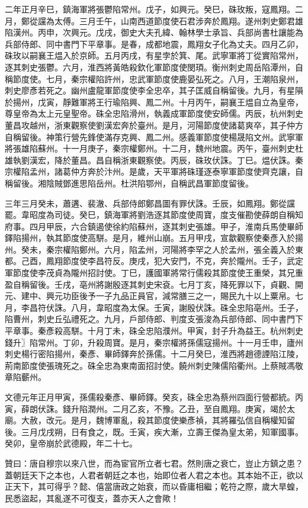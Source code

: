 \begin{pinyinscope}
 二年正月辛巳，鎮海軍將張鬱陷常州。戊子，如興元。癸巳，硃玫叛，寇鳳翔。二月，鄭從讜為太傅。三月壬午，山南西道節度使石君涉奔於鳳翔。遂州刺史鄭君雄陷漢州。丙申，次興元。戊戌，御史大夫孔緯、翰林學士承旨、兵部尚書杜讓能為兵部侍郎、同中書門下平章事。是春，成都地震，鳳翔女子化為丈夫。四月乙卯，硃玫以嗣襄王煴入於京師。五月丙戌，有星孛於箕、尾。武寧軍將丁從實陷常州，逐其刺史張鬱。六月，淮西將黃皓殺欽化軍節度使閔頊。衡州刺史周岳陷潭州，自稱節度使。七月，秦宗權陷許州，忠武軍節度使鹿晏弘死之。八月，王潮陷泉州，刺史廖彥若死之。幽州盧龍軍節度使李全忠卒，其子匡威自稱留後。九月，有星隕於揚州，戊寅，靜難軍將王行瑜陷興、鳳二州。十月丙午，嗣襄王煴自立為皇帝，尊皇帝為太上元皇聖帝。硃全忠陷滑州，執義成軍節度使安師儒。丙辰，杭州刺史董昌攻越州，浙東觀察使劉漢宏奔於臺州。是月，河陽節度使諸葛爽卒，其子仲方自稱留後。神策行營先鋒使滿存克興、鳳二州。感義軍節度使楊晟陷文州。武寧軍將張雄陷蘇州。十一月庚子，秦宗權鄭州。十二月，魏州地震。丙午，臺州刺史杜雄執劉漢宏，降於董昌。昌自稱浙東觀察使。丙辰，硃玫伏誅。丁巳。煴伏誅。秦宗權陷孟州，諸葛仲方奔於汴州。是歲，天平軍將硃瑾逐泰寧軍節度使齊克讓，自稱留後。湘陰賊鄧進思陷岳州。杜洪陷鄂州，自稱武昌軍節度留後。



 三年三月癸未，蕭遘、裴澈、兵部侍郎鄭昌圖有罪伏誅。壬辰，如鳳翔。鄭從讜罷。韋昭度為司徒。癸巳，鎮海軍將劉浩逐其節度使周寶，度支催勘使薛朗自稱知府事。四月甲辰，六合鎮遏使徐約陷蘇州，逐其刺史張雄。甲子，淮南兵馬使畢師鐸陷揚州，執其節度使高駢。是月，維州山崩。五月甲戌，宣歙觀察使秦彥入於揚州。癸未，秦宗權陷鄭州。六月，陷孟州，河陽將李罕之人於孟州，張全義入於東都。己酉，鳳翔節度使李昌符反。庚戌，犯大安門，不克，奔於隴州。壬子，武定軍節度使李茂貞為隴州招討使。丁巳，護國軍將常行儒殺其節度使王重榮，其兄重盈自稱留後。壬戌，亳州將謝殷逐其刺史宋袞。七月丁亥，降死罪以下，貞觀、開元、建中、興元功臣後予一子九品正員官，減常膳三之一，賜民九十以上粟帛。七月，李昌符伏誅。八月，韋昭度為太保。壬寅，謝殷伏誅。硃全忠陷亳州。壬子，陷曹州，刺史丘弘禮死之。九月，戶部侍郎、判度支張浚為兵部侍郎、同中書門下平章事。秦彥殺高駢。十月丁未，硃全忠陷濮州。甲寅，封子升為益王。杭州刺史錢升〗陷常州。丁卯，升殺周寶。是月，秦宗權將孫儒寇揚州。十一月壬申，廬州刺史楊行密陷揚州，秦彥、畢師鐸奔於孫儒。十二月癸巳，淮西將趙德諲陷江陵，荊南節度使張瑰死之。硃全忠為東南面招討使。饒州刺史陳儒陷衢州。上蔡賊馮敬章陷蘄州。



 文德元年正月甲寅，孫儒殺秦彥、畢師鐸。癸亥，硃全忠為蔡州四面行營都統。丙寅，薛朗伏誅。錢升陷潤州。二月乙亥，不豫。乙丑，至自鳳翔。庚寅，竭於太廟。大赦，改元。是月，魏博軍亂，殺其節度使樂彥禎，其將羅弘信自稱權知留後。三月戊戌朔，日有食之，既。壬寅，疾大漸，立壽王傑為皇太弟，知軍國事。癸卯，皇帝崩於武德殿，年二十七。



 贊曰：唐自穆宗以來八世，而為宦官所立者七君。然則唐之衰亡，豈止方鎮之患？蓋朝廷天下之本也，人君者朝廷之本也，始即位者人君之本也。其本始不正，欲以正天下，其可得乎？懿、僖當唐政之始衰，而以昏庸相繼；乾符之際，歲大旱蝗，民悉盜起，其亂遂不可復支，蓋亦天人之會歟！



\end{pinyinscope}